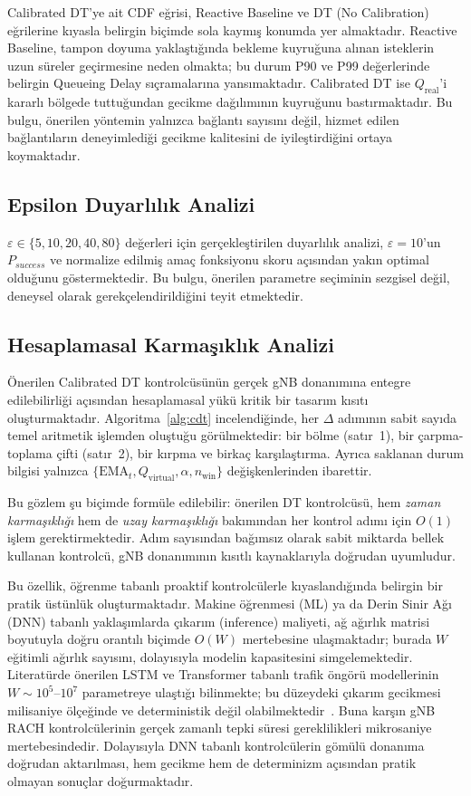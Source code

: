 \documentclass[conference]{IEEEtran}
\newcommand{\qreal}{Q_{\mathrm{real}}}
\newcommand{\qvirt}{Q_{\mathrm{virtual}}}
\newcommand{\ema}{\mathrm{EMA}}
\begin{document}
Calibrated DT'ye ait CDF eğrisi, Reactive Baseline ve DT (No Calibration)
eğrilerine kıyasla belirgin biçimde sola kaymış konumda yer almaktadır.
Reactive Baseline, tampon doyuma yaklaştığında bekleme kuyruğuna alınan
isteklerin uzun süreler geçirmesine neden olmakta; bu durum P90 ve P99
değerlerinde belirgin Queueing Delay sıçramalarına yansımaktadır. Calibrated DT
ise $\qreal$'i kararlı bölgede tuttuğundan gecikme dağılımının kuyruğunu
bastırmaktadır. Bu bulgu, önerilen yöntemin yalnızca bağlantı sayısını değil,
hizmet edilen bağlantıların deneyimlediği gecikme kalitesini de iyileştirdiğini
ortaya koymaktadır.

\subsection{Epsilon Duyarlılık Analizi}

$\varepsilon \in \{5, 10, 20, 40, 80\}$ değerleri için gerçekleştirilen
duyarlılık analizi, $\varepsilon = 10$'un $P_{success}$ ve normalize edilmiş
amaç fonksiyonu skoru açısından yakın optimal olduğunu göstermektedir. Bu
bulgu, önerilen parametre seçiminin sezgisel değil, deneysel olarak
gerekçelendirildiğini teyit etmektedir.

\subsection{Hesaplamasal Karmaşıklık Analizi}

Önerilen Calibrated DT kontrolcüsünün gerçek gNB donanımına entegre
edilebilirliği açısından hesaplamasal yükü kritik bir tasarım kısıtı
oluşturmaktadır. Algoritma~\ref{alg:cdt} incelendiğinde, her $\Delta$
adımının sabit sayıda temel aritmetik işlemden oluştuğu görülmektedir: bir
bölme (satır~1), bir çarpma-toplama çifti (satır~2), bir kırpma ve birkaç
karşılaştırma. Ayrıca saklanan durum bilgisi yalnızca $\{\ema_t, \qvirt,
\alpha, n_{\mathrm{win}}\}$ değişkenlerinden ibarettir.

Bu gözlem şu biçimde formüle edilebilir: önerilen DT kontrolcüsü, hem
\emph{zaman karmaşıklığı} hem de \emph{uzay karmaşıklığı} bakımından her
kontrol adımı için $O(1)$ işlem gerektirmektedir. Adım sayısından bağımsız
olarak sabit miktarda bellek kullanan kontrolcü, gNB donanımının kısıtlı
kaynaklarıyla doğrudan uyumludur.

Bu özellik, öğrenme tabanlı proaktif kontrolcülerle kıyaslandığında belirgin
bir pratik üstünlük oluşturmaktadır. Makine öğrenmesi (ML) ya da Derin Sinir
Ağı (DNN) tabanlı yaklaşımlarda çıkarım (inference) maliyeti, ağ ağırlık
matrisi boyutuyla doğru orantılı biçimde $O(W)$ mertebesine ulaşmaktadır;
burada $W$ eğitimli ağırlık sayısını, dolayısıyla modelin kapasitesini
simgelemektedir. Literatürde önerilen LSTM ve Transformer tabanlı trafik öngörü
modellerinin $W \sim 10^5$--$10^7$ parametreye ulaştığı bilinmekte; bu
düzeydeki çıkarım gecikmesi milisaniye ölçeğinde ve deterministik değil
olabilmektedir~\cite{b9}. Buna karşın gNB RACH kontrolcülerinin gerçek zamanlı
tepki süresi gereklilikleri mikrosaniye mertebesindedir. Dolayısıyla DNN tabanlı
kontrolcülerin gömülü donanıma doğrudan aktarılması, hem gecikme hem de
determinizm açısından pratik olmayan sonuçlar doğurmaktadır.
\end{document}
